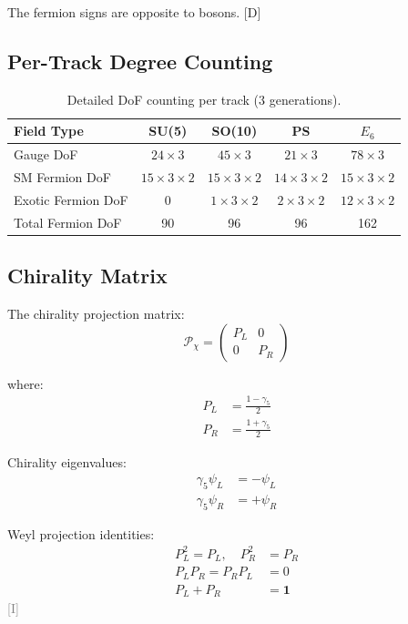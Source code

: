 \documentclass[11pt,a4paper]{article}
\newcommand{\tagD}{\textcolor{blue!70!black}{[D]}}
\newcommand{\tagI}{\textcolor{gray}{[I]}}
\begin{document}
The fermion signs are opposite to bosons. \tagD

\subsection{Per-Track Degree Counting}

\begin{table}[h]
\centering
\caption{Detailed DoF counting per track (3 generations).}
\label{tab:dof-detail}
\begin{tabular}{lcccc}
\toprule
Field Type & SU(5) & SO(10) & PS & $E_6$ \\
\midrule
Gauge DoF & $24 \times 3$ & $45 \times 3$ & $21 \times 3$ & $78 \times 3$ \\
SM Fermion DoF & $15 \times 3 \times 2$ & $15 \times 3 \times 2$ & $14 \times 3 \times 2$ & $15 \times 3 \times 2$ \\
Exotic Fermion DoF & 0 & $1 \times 3 \times 2$ & $2 \times 3 \times 2$ & $12 \times 3 \times 2$ \\
\midrule
Total Fermion DoF & 90 & 96 & 96 & 162 \\
\bottomrule
\end{tabular}
\end{table}

\subsection{Chirality Matrix}

The chirality projection matrix:
\begin{equation}
\label{eq:chir-matrix}
\mathcal{P}_{\chi} = \begin{pmatrix} P_L & 0 \\ 0 & P_R \end{pmatrix}
\end{equation}

where:
\begin{align}
\label{eq:PL-matrix}
P_L &= \frac{1 - \gamma_5}{2} \\
\label{eq:PR-matrix}
P_R &= \frac{1 + \gamma_5}{2}
\end{align}

Chirality eigenvalues:
\begin{align}
\label{eq:chir-L}
\gamma_5 \psi_L &= -\psi_L \\
\label{eq:chir-R}
\gamma_5 \psi_R &= +\psi_R
\end{align}

Weyl projection identities:
\begin{align}
\label{eq:proj-idem}
P_L^2 = P_L, \quad P_R^2 &= P_R \\
\label{eq:proj-ortho}
P_L P_R = P_R P_L &= 0 \\
\label{eq:proj-complete}
P_L + P_R &= \mathbf{1}
\end{align}
\tagI
\end{document}
